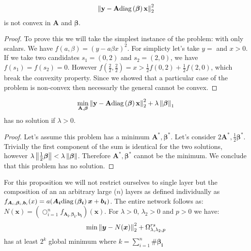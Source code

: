 \begin{proposition}
\label{unconstrained_non_convex}
\begin{equation*}
     \left\lVert\bf{y} - \bf{A}\text{diag}\left(\bm{\beta}\right)\bf{x}\right\rVert_2^2
\end{equation*}
is not convex in $\bm{A}$ and $\bm{\beta}$.
\begin{proof}
  To prove this we will take the simplest instance of the problem: with only scalars. We have $f(a, \beta) = \left(y - a\beta x\right)^2$. For simplicty let's take $y = $ and $x > 0$. If we take two candidates $s_1 = (0, 2)$ and $s_2 = (2, 0)$, we have $f(s_1) = f(s_2) = 0$. However $f(\frac{2}{2}, \frac{2}{2}) = x > \frac{1}{2} f(0, 2) + \frac{1}{2}f(2, 0)$, which break the convexity property. Since we showed that a particular case of the problem is non-convex then necessarly the general cannot be convex.
\end{proof}
\end{proposition}

\begin{proposition}
\label{unconstrained_shrinknet_no_min}
\begin{equation*}
     \min_{\bf{A}, \bm{\beta}} \left\lVert\bf{y} - \bf{A}\text{diag}\left(\bm{\beta}\right)\bf{x}\right\rVert_2^2 + \lambda \left\lVert\bm{\beta}\right\rVert_1
\end{equation*}
has no solution if $\lambda > 0$.
\end{proposition}
\begin{proof}
  Let's assume this problem has a minimum $\bm{A}^*, \bm{\beta}^*$. Let's consider $2\bm{A}^*, \frac{1}{2}\bm{\beta}^*$. Trivially the first component of the sum is identical for the two solutions, however $\lambda\left\lVert\frac{1}{2}\bm{\beta}\right\rVert < \lambda\left\lVert\bm{\beta}\right\rVert$. Therefore $\bm{A}^*, \bm{\beta}^*$ cannot be the minimum. We conclude that this problem has no solution.
\end{proof}
\begin{proposition}
  \label{shrinknet_regularized_minimum}
For this proposition we will not restrict ourselves to single layer but the composition of an an arbitrary large ($n$) layers as defined individually as $f_{\bm{A}_i, \bm{\beta}_i, \bm{b}_i}(x) = a(\bm{A_i}\text{diag}\left(\bm{\beta_i}\right)\bm{x} + \bm{b_i})$. The entire network follows as: $N(\bm{x}) = \left(\bigcirc_{i=1}^n f_{\bm{A_i}, \bm{\beta_i}, \bm{b_i}}\right)(\bm{x})$. For $\lambda > 0$, $\lambda_2 > 0$ and $p > 0$ we have:
  \begin{equation*}
    \min \left\lVert\bm{y} - N(\bm{x})\right\rVert_2^2 + \Omega_{\lambda, \lambda_2, p}^{rs}
  \end{equation*}
  has at least $2^k$ global minimum where $k = \sum_{i=1}^n \#\bm{\beta_i}$
\end{proposition}

